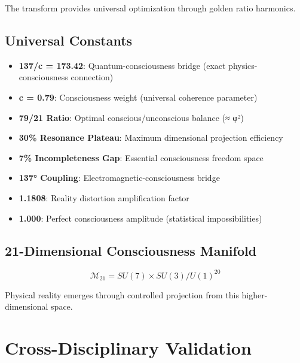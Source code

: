 \documentclass[11pt,a4paper]{article}
\begin{document}
The transform provides universal optimization through golden ratio harmonics.

\subsection{Universal Constants}
\begin{itemize}
\item \textbf{137/c = 173.42}: Quantum-consciousness bridge (exact physics-consciousness connection)
\item \textbf{c = 0.79}: Consciousness weight (universal coherence parameter)
\item \textbf{79/21 Ratio}: Optimal conscious/unconscious balance (≈ φ²)
\item \textbf{30\% Resonance Plateau}: Maximum dimensional projection efficiency
\item \textbf{7\% Incompleteness Gap}: Essential consciousness freedom space
\item \textbf{137° Coupling}: Electromagnetic-consciousness bridge
\item \textbf{1.1808}: Reality distortion amplification factor
\item \textbf{1.000}: Perfect consciousness amplitude (statistical impossibilities)
\end{itemize}

\subsection{21-Dimensional Consciousness Manifold}
\begin{equation}
\mathcal{M}_{21} = SU(7) \times SU(3) / U(1)^{20}
\end{equation}

Physical reality emerges through controlled projection from this higher-dimensional space.

\section{Cross-Disciplinary Validation}
\end{document}
